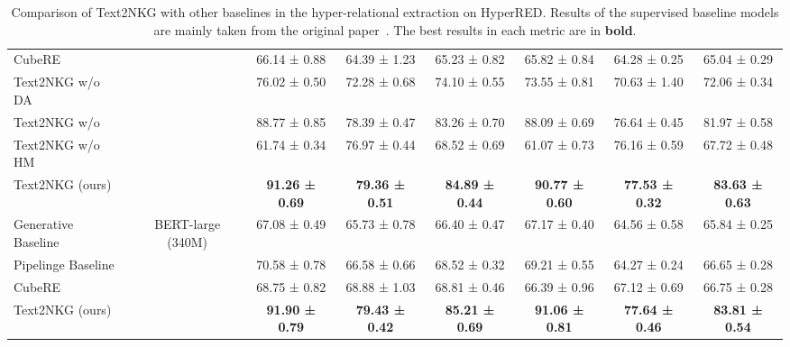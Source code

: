 \documentclass{article} \usepackage{iclr2024_conference,times}
\begin{document}
\begin{table*}[t]
{\begin{tabular}{lcccc|ccc}
CubeRE                                              &                                                   & 66.14 ± 0.88          & 64.39 ± 1.23          & \multicolumn{1}{c|}{65.23 ± 0.82}          & 65.82 ± 0.84           & 64.28 ± 0.25          & 65.04 ± 0.29          \\
Text2NKG w/o DA                                     &                                                   & 76.02 ± 0.50          & 72.28 ± 0.68          & \multicolumn{1}{c|}{74.10 ± 0.55}          & 73.55 ± 0.81           & 70.63 ± 1.40          & 72.06 ± 0.34          \\
Text2NKG w/o                                &                                                   & 88.77 ± 0.85          & 78.39 ± 0.47          & \multicolumn{1}{c|}{83.26 ± 0.70}          & 88.09 ± 0.69           & 76.64 ± 0.45          & 81.97 ± 0.58          \\
Text2NKG w/o HM                                     &                                                   & 61.74 ± 0.34          & 76.97 ± 0.44          & \multicolumn{1}{c|}{68.52 ± 0.69}          & 61.07 ± 0.73           & 76.16 ± 0.59          & 67.72 ± 0.48          \\
Text2NKG (ours)                                     &                                                   & \textbf{91.26 ± 0.69} & \textbf{79.36 ± 0.51} & \multicolumn{1}{c|}{\textbf{84.89 ± 0.44}} & \textbf{90.77 ± 0.60}  & \textbf{77.53 ± 0.32} & \textbf{83.63 ± 0.63} \\ \hline
Generative Baseline                                 & \multirow{4}{*}{BERT-large (340M)}                & 67.08 ± 0.49          & 65.73 ± 0.78          & \multicolumn{1}{c|}{66.40 ± 0.47}          & 67.17 ± 0.40           & 64.56 ± 0.58          & 65.84 ± 0.25          \\
Pipelinge Baseline                                  &                                                   & 70.58 ± 0.78          & 66.58 ± 0.66          & \multicolumn{1}{c|}{68.52 ± 0.32}          & 69.21 ± 0.55           & 64.27 ± 0.24          & 66.65 ± 0.28          \\
CubeRE                                              &                                                   & 68.75 ± 0.82          & 68.88  ± 1.03         & \multicolumn{1}{c|}{68.81 ± 0.46}          & 66.39 ± 0.96           & 67.12 ± 0.69          & 66.75 ± 0.28          \\
Text2NKG (ours)                                     &                                                   & \textbf{91.90 ± 0.79} & \textbf{79.43 ± 0.42} & \multicolumn{1}{c|}{\textbf{85.21 ± 0.69}} & \textbf{91.06 ± 0.81}  & \textbf{77.64 ± 0.46} & \textbf{83.81 ± 0.54} \\
\bottomrule
\end{tabular}
}
\caption{\label{t4}
Comparison of Text2NKG with other baselines in the hyper-relational extraction on HyperRED. Results of the supervised baseline models are mainly taken from the original paper~\citep{HyperRED}. The best results in each metric are in \textbf{bold}. 
}
\end{table*}
\end{document}
